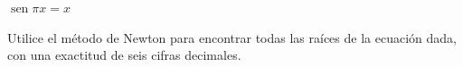 \item $\operatorname{sen} \pi x = x$
\par
Utilice el método de Newton para encontrar todas las raíces de la ecuación dada, con una exactitud de seis cifras decimales.

